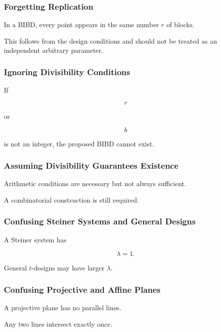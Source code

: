 \subsubsection{Forgetting Replication}

In a BIBD, every point appears in the same number \(r\) of blocks.

This follows from the design conditions and should not be treated as an
independent arbitrary parameter.

\subsubsection{Ignoring Divisibility Conditions}

If

\[
r
\]

or

\[
b
\]

is not an integer, the proposed BIBD cannot exist.

\subsubsection{Assuming Divisibility Guarantees Existence}

Arithmetic conditions are necessary but not always sufficient.

A combinatorial construction is still required.

\subsubsection{Confusing Steiner Systems and General Designs}

A Steiner system has

\[
\lambda=1.
\]

General \(t\)-designs may have larger \(\lambda\).

\subsubsection{Confusing Projective and Affine Planes}

A projective plane has no parallel lines.

Any two lines intersect exactly once.

